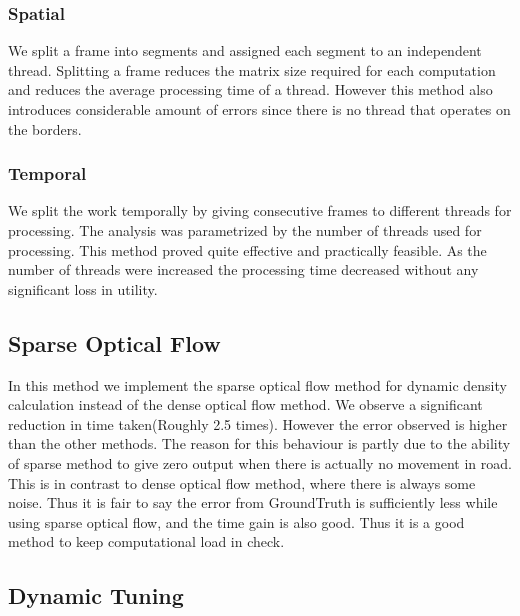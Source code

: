 \documentclass[conference]{IEEEtran}
\begin{document}
\subsubsection{Spatial}
We split a frame into segments and assigned each segment to an independent thread. Splitting a frame reduces the matrix size required for each computation and reduces the
average processing time of a thread. However this method also introduces considerable amount of errors since there is no thread that operates on the borders.

\subsubsection{Temporal}
We split the work temporally by giving consecutive frames to different threads for processing. The analysis was parametrized by the number of threads used for processing. This method proved quite effective and practically feasible. As the number of threads were increased the processing time decreased without any significant loss in utility.

\subsection{Sparse Optical Flow}

In this method we implement the sparse optical flow method for dynamic density calculation instead of the dense optical flow method.
We observe a significant reduction in time taken(Roughly 2.5 times). However the error observed is higher than the other methods.
The reason for this behaviour is partly due to the ability of sparse method to give zero output when there is actually no movement in road. This is in contrast to dense optical flow method,
where there is always some noise. Thus it is fair to say the error from GroundTruth is sufficiently less while using sparse optical flow, and the time gain is also good. Thus it is a good method to keep computational load in check.

\subsection{Dynamic Tuning}
\end{document}
